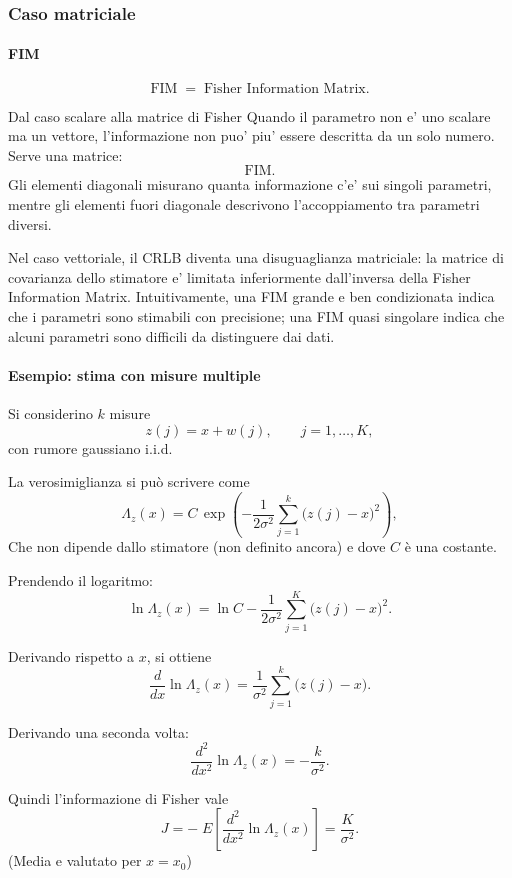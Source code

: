 \documentclass[11pt,a4paper]{article}
\begin{document}
\subsubsection*{Caso matriciale}

\paragraph{FIM}
\[
\mathrm{FIM} \;=\; \text{Fisher Information Matrix}.
\]

\begin{spiegazione}{Dal caso scalare alla matrice di Fisher}
Quando il parametro non e' uno scalare ma un vettore, l'informazione non puo' piu' essere descritta da un solo numero. Serve una matrice:
\[
\mathrm{FIM}.
\]
Gli elementi diagonali misurano quanta informazione c'e' sui singoli parametri, mentre gli elementi fuori diagonale descrivono l'accoppiamento tra parametri diversi.

Nel caso vettoriale, il CRLB diventa una disuguaglianza matriciale: la matrice di covarianza dello stimatore e' limitata inferiormente dall'inversa della Fisher Information Matrix. Intuitivamente, una FIM grande e ben condizionata indica che i parametri sono stimabili con precisione; una FIM quasi singolare indica che alcuni parametri sono difficili da distinguere dai dati.
\end{spiegazione}

\paragraph{Esempio: stima con misure multiple}

Si considerino \(k\) misure
\[
z(j)=x+w(j),
\qquad j=1,\dots,K,
\]
con rumore gaussiano i.i.d.

La verosimiglianza si può scrivere come
\[
\Lambda_z(x)
=
C\,
\exp\!\left(
-\frac{1}{2\sigma^2}\sum_{j=1}^{k}\bigl(z(j)-x\bigr)^2
\right),
\]
Che non dipende dallo stimatore (non definito ancora) e dove \(C\) è una costante.

Prendendo il logaritmo:
\[
\ln \Lambda_z(x)
=
\ln C
-
\frac{1}{2\sigma^2}\sum_{j=1}^{K}\bigl(z(j)-x\bigr)^2 .
\]

Derivando rispetto a \(x\), si ottiene
\[
\frac{d}{dx}\ln \Lambda_z(x)
=
\frac{1}{\sigma^2}\sum_{j=1}^{k}\bigl(z(j)-x\bigr).
\]

Derivando una seconda volta:
\[
\frac{d^2}{dx^2}\ln \Lambda_z(x)
=
-\frac{k}{\sigma^2}.
\]

Quindi l'informazione di Fisher vale
\[
J
=
-\;E\!\left[
\frac{d^2}{dx^2}\ln \Lambda_z(x)
\right]
=
\frac{K}{\sigma^2}.
\]
(Media e valutato per $x = x_0$)
\end{document}
